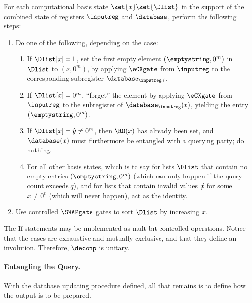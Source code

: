       \begin{definition}
        For each computational basis state $\ket{x}\ket{\Dlist}$ in the
          support of the combined state of registers $\inputreg$ and
          $\database$, perform the following steps:
        \begin{enumerate}
          \item Do one of the following, depending on the case: 
          \begin{enumerate}
            \item If $\Dlist[x] = \perp$, set
              the first empty element $(\emptystring, 0^m)$ in $\Dlist$ to
              $(x, 0^m)$, by applying $\eCXgate$ from $\inputreg$ to the
              corresponding subregister $\database_{\inputreg,i}$.
            \item If $\Dlist[x] = 0^m$, ``forget'' the element by applying 
              $\eCXgate$ from $\inputreg$ to the subregister
              of $\database_{\inputreg}(x)$,
              yielding the entry $(\emptystring, 0^m)$. 
            \item If $\Dlist[x] = \hat{y} \neq 0^m$, then $\RO(x)$ has already been
              set, and $\database(x)$ must furthermore be entangled with a
              querying party; do nothing.
            \item For all other basis states, which is to say for lists $\Dlist$ that 
              contain no empty entries $(\emptystring, 0^m)$ (which can
              only happen if the query count exceeds $q$), and for lists that
              contain invalid values $\slashed{x}$ for some $x \neq 0^n$ (which will
              never happen), act as the identity.
          \end{enumerate}
          \item Use controlled $\SWAPgate$ gates to sort $\Dlist$ by increasing $x$.
        \end{enumerate}

        \noindent
        The If-statements may be implemented as mult-bit controlled
        operations. Notice that the cases are exhaustive and mutually
        exclusive, and that they define an involution. Therefore, $\decomp$ is
        unitary.
      \end{definition}

    \paragraph{Entangling the Query.}
      With the database updating procedure defined, all that remains is to 
        define how the output is to be prepared. 

